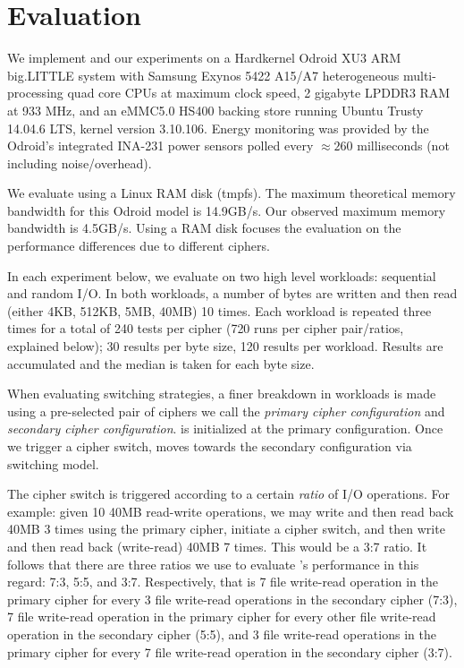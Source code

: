 \section{Evaluation}\label{sec:eval}

We implement \sys and our experiments on a Hardkernel Odroid XU3 ARM big.LITTLE
system with Samsung Exynos 5422 A15/A7 heterogeneous multi-processing quad core
CPUs at maximum clock speed, 2 gigabyte LPDDR3 RAM at 933 MHz, and an eMMC5.0
HS400 backing store running Ubuntu Trusty 14.04.6 LTS, kernel version 3.10.106.
Energy monitoring was provided by the Odroid's integrated INA-231 power sensors
polled every $\approx{260}$ milliseconds (not including noise/overhead).

We evaluate \sys using a Linux RAM disk (tmpfs). The maximum theoretical memory
bandwidth for this Odroid model is 14.9GB/s\@. Our observed maximum memory
bandwidth is 4.5GB/s. Using a RAM disk focuses the evaluation on the performance
differences due to different ciphers.

In each experiment below, we evaluate \sys on two high level workloads:
sequential and random I/O. In both workloads, a number of bytes are written and
then read (either 4KB, 512KB, 5MB, 40MB) 10 times. Each workload is repeated
three times for a total of 240 tests per cipher (720 runs per cipher
pair/ratios, explained below); 30 results per byte size, 120 results per
workload. Results are accumulated and the median is taken for each byte size.

When evaluating switching strategies, a finer breakdown in workloads is made
using a pre-selected pair of ciphers we call the {\em primary cipher
configuration} and {\em secondary cipher configuration}. \sys is initialized at
the primary configuration. Once we trigger a cipher switch, \sys moves towards
the secondary configuration via switching model.

The cipher switch is triggered according to a certain {\em ratio} of I/O
operations. For example: given 10 40MB read-write operations, we may write and
then read back 40MB 3 times using the primary cipher, initiate a cipher switch,
and then write and then read back (write-read) 40MB 7 times. This would be a 3:7
ratio. It follows that there are three ratios we use to evaluate \sys's
performance in this regard: 7:3, 5:5, and 3:7. Respectively, that is 7 file
write-read operation in the primary cipher for every 3 file write-read
operations in the secondary cipher (7:3), 7 file write-read operation in the
primary cipher for every other file write-read operation in the secondary cipher
(5:5), and 3 file write-read operations in the primary cipher for every 7 file
write-read operation in the secondary cipher (3:7).

